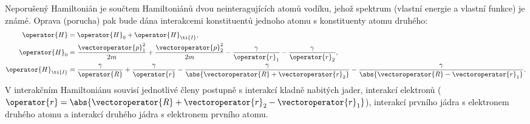 \begin{solution}
	Neporušený Hamiltonián je součtem Hamiltoniánů dvou neinteragujících atomů vodíku, jehož spektrum (vlastní energie a vlastní funkce) je známé.
	Oprava (porucha) pak bude dána interakcemi konstituentů jednoho atomu s konstituenty atomu druhého:
    \begin{subequations}
        \begin{align}
            \operator{H}&=\operator{H}_{0}+\operator{H}_{\ti{I}},\\
            \operator{H}_{0}&=\frac{\vectoroperator{p}_{1}^{2}}{2m}+\frac{\vectoroperator{p}_{2}^{2}}{2m}-\frac{\gamma}{\operator{r}_{1}}-\frac{\gamma}{\operator{r}_{2}},\\
            \operator{H}_{\ti{I}}&=\frac{\gamma}{\operator{R}}+\frac{\gamma}{\operator{r}}-\frac{\gamma}{\abs{\vectoroperator{R}+\vectoroperator{r}_{2}}}-\frac{\gamma}{\abs{\vectoroperator{R}-\vectoroperator{r}_{1}}}.
    	\end{align}                
    \end{subequations}
	V interakčním Hamiltoniánu souvisí jednotlivé členy postupně s interakcí kladně nabitých jader, interakcí elektronů ($\operator{r}=\abs{\vectoroperator{R}+\vectoroperator{r}_{2}-\vectoroperator{r}_{1}}$),
	interakcí prvního jádra s elektronem druhého atomu a interakcí druhého jádra s elektronem prvního atomu.


\end{solution}
